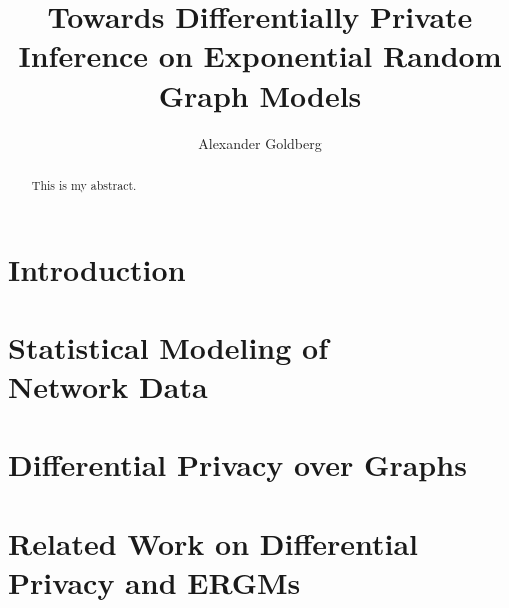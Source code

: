 \documentclass[12pt]{report}
\title{
	{Towards Differentially Private Inference on Exponential Random Graph Models}\\
}
\author{Alexander Goldberg}
\date{}
\begin{document}
	
	\maketitle 
	
	\begin{abstract}
		This is my abstract.
	\end{abstract}
	
	\tableofcontents
	
	\chapter{Introduction}\label{ch:intro}
	
	
	
	\chapter[Statistical Modeling of Network Data]{Statistical Modeling of\\ Network Data}
	\label{ch:network_modeling}
	
	
	
	\chapter{Differential Privacy over Graphs}\label{ch:dp_defns}
	
	
	
	\chapter[Related Work on Differential Privacy and ERGMs]{Related Work on Differential\\ Privacy and ERGMs}\label{ch:related_work}
	
	
	
\end{document}
